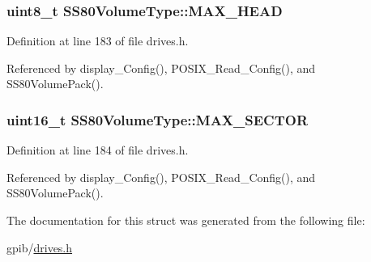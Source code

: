\subsubsection[{\texorpdfstring{M\+A\+X\+\_\+\+H\+E\+AD}{MAX_HEAD}}]{\setlength{\rightskip}{0pt plus 5cm}uint8\+\_\+t S\+S80\+Volume\+Type\+::\+M\+A\+X\+\_\+\+H\+E\+AD}\hypertarget{structSS80VolumeType_acc2870eb0a52a0e7f4dc57f036d903b1}{}\label{structSS80VolumeType_acc2870eb0a52a0e7f4dc57f036d903b1}


Definition at line 183 of file drives.\+h.



Referenced by display\+\_\+\+Config(), P\+O\+S\+I\+X\+\_\+\+Read\+\_\+\+Config(), and S\+S80\+Volume\+Pack().

\subsubsection[{\texorpdfstring{M\+A\+X\+\_\+\+S\+E\+C\+T\+OR}{MAX_SECTOR}}]{\setlength{\rightskip}{0pt plus 5cm}uint16\+\_\+t S\+S80\+Volume\+Type\+::\+M\+A\+X\+\_\+\+S\+E\+C\+T\+OR}\hypertarget{structSS80VolumeType_a0a367b3bf05801cdee9dadc8324a3bdb}{}\label{structSS80VolumeType_a0a367b3bf05801cdee9dadc8324a3bdb}


Definition at line 184 of file drives.\+h.



Referenced by display\+\_\+\+Config(), P\+O\+S\+I\+X\+\_\+\+Read\+\_\+\+Config(), and S\+S80\+Volume\+Pack().



The documentation for this struct was generated from the following file\+:\begin{DoxyCompactItemize}
\item 
gpib/\hyperlink{drives_8h}{drives.\+h}\end{DoxyCompactItemize}
